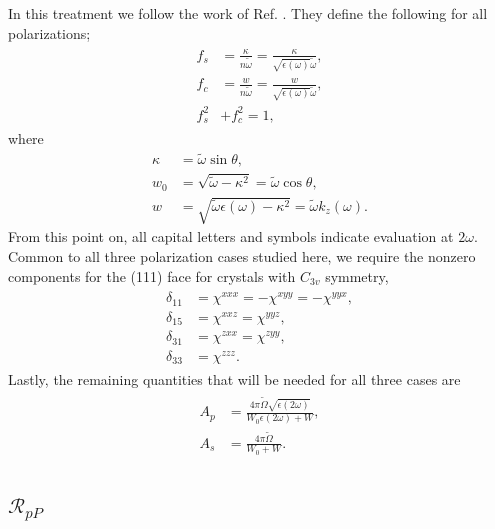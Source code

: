 In this treatment we follow the work of Ref. \cite{sipePRB87}. They define the
following for all polarizations;
\begin{align}\label{fcfs} %
\begin{split}
f_{s} &= \frac{\kappa}{n\tilde{\omega}}
       = \frac{\kappa}{\sqrt{\epsilon(\omega)}\tilde{\omega}},\\
f_{c} &= \frac{w}{n\tilde{\omega}}
       = \frac{w}{\sqrt{\epsilon(\omega)}\tilde{\omega}},\\
f^{2}_{s} &+ f^{2}_{c} = 1,
\end{split}
\end{align}
where 
\begin{align}
\kappa &= \tilde{\omega}\sin\theta,\nonumber\\
w_{0}  &= \sqrt{\tilde{\omega} - \kappa^{2}}
        = \tilde{\omega}\cos\theta,\label{wzero}\\ %
w      &= \sqrt{\tilde{\omega}\epsilon(\omega) - \kappa^{2}}
        = \tilde{\omega}k_{z}(\omega).\label{w} %
\end{align}
From this point on, all capital letters and symbols indicate evaluation at
$2\omega$. Common to all three polarization cases studied here, we require the
nonzero components for the (111) face for crystals with $C_{3v}$ symmetry,
\begin{align}\label{deltas} %
\begin{split}
\delta_{11} &= \chi^{xxx} = -\chi^{xyy} = -\chi^{yyx},\\
\delta_{15} &= \chi^{xxz} =  \chi^{yyz},\\
\delta_{31} &= \chi^{zxx} =  \chi^{zyy},\\
\delta_{33} &= \chi^{zzz}.
\end{split}
\end{align}
Lastly, the remaining quantities that will be needed for all three cases are
\begin{align}\label{apas} %
\begin{split}
A_{p} &= \frac{4\pi\tilde{\Omega}\sqrt{\epsilon(2\omega)}}
              {W_{0}\epsilon(2\omega) + W},\\
A_{s} &= \frac{4\pi\tilde{\Omega}}{W_{0} + W}.
\end{split}
\end{align}


\subsection{\texorpdfstring{$\mathcal{R}_{pP}$}{RpP}}

